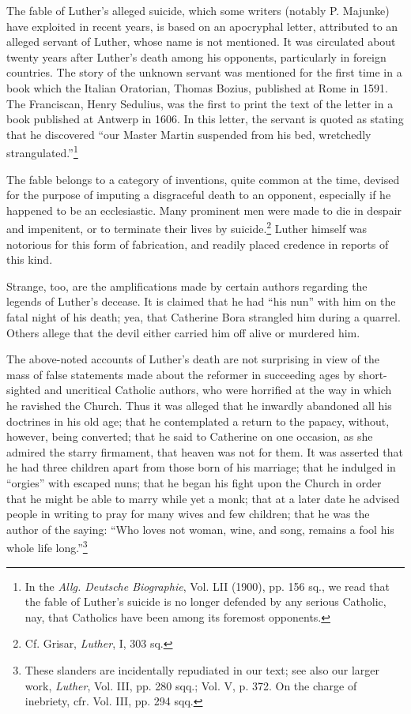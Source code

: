 The fable of Luther’s alleged suicide, which some writers (notably
P. Majunke) have exploited in recent years, is based on an apocryphal
letter, attributed to an alleged servant of Luther, whose name is not
mentioned. It was circulated about twenty years after Luther’s death
among his opponents, particularly in foreign countries. The story of
the unknown servant was mentioned for the first time in a book
which the Italian Oratorian, Thomas Bozius, published at Rome in
1591. The Franciscan, Henry Sedulius, was the first to print the text
of the letter in a book published at Antwerp in 1606. In this letter,
the servant is quoted as stating that he discovered “our Master Martin
suspended from his bed, wretchedly strangulated.”\footnote
{In the \textit{Allg. Deutsche Biographie}, Vol. LII (1900), pp. 156 sq., we read that the fable
of Luther’s suicide is no longer defended by any serious Catholic, nay, that Catholics have
been among its foremost opponents.}

The fable belongs to a category of inventions, quite common at the
time, devised for the purpose of imputing a disgraceful death to
an opponent, especially if he happened to be an ecclesiastic. Many
prominent men were made to die in despair and impenitent, or to terminate
their lives by suicide.\footnote{Cf. Grisar, \textit{Luther}, I, 303 sq.}
Luther himself was notorious for this
form of fabrication, and readily placed credence in reports of this
kind.

Strange, too, are the amplifications made by certain authors regarding
the legends of Luther’s decease. It is claimed that he had “his nun”
with him on the fatal night of his death; yea, that Catherine Bora
strangled him during a quarrel. Others allege that the devil either carried
him off alive or murdered him.

The above-noted accounts of Luther’s death are not surprising
in view of the mass of false statements made about the reformer in
succeeding ages by short-sighted and uncritical Catholic authors, who
were horrified at the way in which he ravished the Church. Thus it
was alleged that he inwardly abandoned all his doctrines in his old
age; that he contemplated a return to the papacy, without, however,
being converted; that he said to Catherine on one occasion, as she
admired the starry firmament, that heaven was not for them. It was
asserted that he had three children apart from those born of his marriage;
that he indulged in “orgies” with escaped nuns; that he began
his fight upon the Church in order that he might be able to marry
while yet a monk; that at a later date he advised people in writing to
pray for many wives and few children; that he was the author of the
saying: “Who loves not woman, wine, and song, remains a fool his
whole life long.”\footnote
{These slanders are incidentally repudiated in our text; see also our larger work, \textit{Luther},
Vol. III, pp. 280 sqq.; Vol. V, p. 372. On the charge of inebriety, cfr. Vol. III, pp. 294
sqq.}

